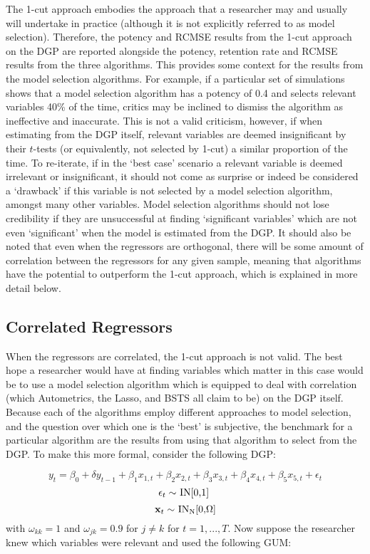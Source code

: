 The 1-cut approach embodies the approach that a researcher may and usually will undertake in practice (although it is not explicitly referred to as model selection). Therefore, the potency and RCMSE results from the 1-cut approach on the DGP are reported alongside the potency, retention rate and RCMSE results from the three algorithms. This provides some context for the results from the model selection algorithms. For example, if a particular set of simulations shows that a model selection algorithm has a potency of 0.4 and selects relevant variables 40\% of the time, critics may be inclined to dismiss the algorithm as ineffective and inaccurate. This is not a valid criticism, however, if when estimating from the DGP itself, relevant variables are deemed insignificant by their $t$-tests (or equivalently, not selected by 1-cut) a similar proportion of the time. To re-iterate, if in the `best case' scenario a relevant variable is deemed irrelevant or insignificant, it should not come as surprise or indeed be considered a `drawback' if this variable is not selected by a model selection algorithm, amongst many other variables. Model selection algorithms should not lose credibility if they are unsuccessful at finding `significant variables' which are not even `significant' when the model is estimated from the DGP. It should also be noted that even when the regressors are orthogonal, there will be some amount of correlation between the regressors for any given sample, meaning that algorithms have the potential to outperform the 1-cut approach, which is explained in more detail below.


 

\subsection{Correlated Regressors}

When the regressors are correlated, the 1-cut approach is not valid. The best hope a researcher would have at finding variables which matter in this case would be to use a model selection algorithm which is equipped to deal with correlation (which Autometrics, the Lasso, and BSTS all claim to be) on the DGP itself. Because each of the algorithms employ different approaches to model selection, and the question over which one is the `best' is subjective, the benchmark for a particular algorithm are the results from using that algorithm to select from the DGP.  To make this more formal, consider the following DGP:


$$y_{t}=\beta_{0} + \delta y_{t-1}+\beta_{1}x_{1,t}+\beta_{2}x_{2,t}+ \beta_{3}x_{3,t}+ \beta_{4}x_{4,t}+ \beta_{5}x_{5,t} + \epsilon_{t}$$
$$\centerline{$\epsilon_{t} \sim $ IN[0,1] }$$
 $$\centerline{$\textbf{x}_{t} \sim $ IN\textsubscript{N}[0,$\Omega$]}$$
with $\omega_{kk} = 1$ and $\omega_{jk} = 0.9$ for $j \neq k $ for $t=1,...,T$. Now suppose the researcher knew which variables were relevant and used the following GUM:


